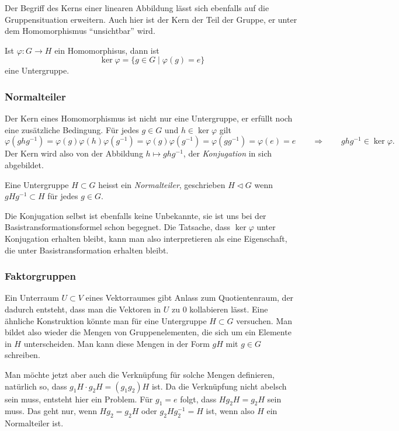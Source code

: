 Der Begriff des Kerns einer linearen Abbildung lässt sich ebenfalls auf
die Gruppensituation erweitern.
Auch hier ist der Kern der Teil der Gruppe, er unter dem 
Homomorphismus ``unsichtbar'' wird.

\begin{definition}
Ist $\varphi\colon G\to H$ ein Homomorphisus, dann ist
\[
\ker\varphi
=
\{g\in G\;|\; \varphi(g)=e\}
\]
eine Untergruppe.
%
\end{definition}

\subsubsection{Normalteiler}
Der Kern eines Homomorphismus ist nicht nur eine Untergruppe, er erfüllt
noch eine zusätzliche Bedingung. 
Für jedes $g\in G$ und $h\in\ker\varphi$ gilt 
\[
\varphi(ghg^{-1})
=
\varphi(g)\varphi(h)\varphi(g^{-1})
=
\varphi(g)\varphi(g^{-1})
=
\varphi(gg^{-1})
=
\varphi(e)
=
e
\qquad\Rightarrow\qquad
ghg^{-1}\in\ker\varphi.
\]
Der Kern wird also von der Abbildung $h\mapsto ghg^{-1}$,
der {\em Konjugation} in sich abgebildet.

\begin{definition}
Eine Untergruppe $H \subset G$ heisst ein {\em Normalteiler},
geschrieben $H \triangleleft G$
wenn $gHg^{-1}\subset H$ für jedes $g\in G$.
\end{definition}

Die Konjugation selbst ist ebenfalls keine Unbekannte, sie ist uns
bei der Basistransformationsformel schon begegnet.
Die Tatsache, dass $\ker\varphi$ unter Konjugation erhalten bleibt,
kann man also interpretieren als eine Eigenschaft, die unter
Basistransformation erhalten bleibt.

\subsubsection{Faktorgruppen}
Ein Unterraum $U\subset V$ eines Vektorraumes gibt Anlass zum
Quotientenraum, der dadurch entsteht, dass man die Vektoren in $U$
zu $0$ kollabieren lässt.
Eine ähnliche Konstruktion könnte man für eine Untergruppe $H \subset G$
versuchen.
Man bildet also wieder die Mengen von Gruppenelementen, die sich um
ein Elemente in $H$ unterscheiden.
Man kann diese Mengen in der Form $gH$ mit $g\in G$ schreiben.

Man möchte jetzt aber auch die Verknüpfung für solche Mengen 
definieren, natürlich so, dass $g_1H\cdot g_2H = (g_1g_2)H$ ist.
Da die Verknüpfung nicht abelsch sein muss, entsteht hier
ein Problem.
Für $g_1=e$ folgt, dass $Hg_2H=g_2H$ sein muss.
Das geht nur, wenn $Hg_2=g_2H$ oder $g_2Hg_2^{-1}=H$ ist, wenn
also $H$ ein Normalteiler ist.

